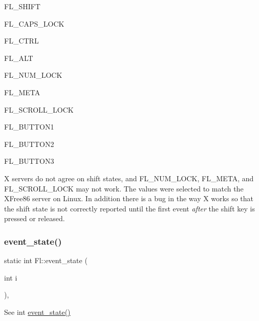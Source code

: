 \begin{DoxyItemize}
\item F\+L\+\_\+\+S\+H\+I\+FT \item F\+L\+\_\+\+C\+A\+P\+S\+\_\+\+L\+O\+CK \item F\+L\+\_\+\+C\+T\+RL \item F\+L\+\_\+\+A\+LT \item F\+L\+\_\+\+N\+U\+M\+\_\+\+L\+O\+CK \item F\+L\+\_\+\+M\+E\+TA \item F\+L\+\_\+\+S\+C\+R\+O\+L\+L\+\_\+\+L\+O\+CK \item F\+L\+\_\+\+B\+U\+T\+T\+O\+N1 \item F\+L\+\_\+\+B\+U\+T\+T\+O\+N2 \item F\+L\+\_\+\+B\+U\+T\+T\+O\+N3\end{DoxyItemize}
X servers do not agree on shift states, and F\+L\+\_\+\+N\+U\+M\+\_\+\+L\+O\+CK, F\+L\+\_\+\+M\+E\+TA, and F\+L\+\_\+\+S\+C\+R\+O\+L\+L\+\_\+\+L\+O\+CK may not work. The values were selected to match the X\+Free86 server on Linux. In addition there is a bug in the way X works so that the shift state is not correctly reported until the first event {\itshape after} the shift key is pressed or released. \mbox{\label{group__fl__events_ga1ff4a74294e833593504ff6531b6d459}} 
\subsubsection{\texorpdfstring{event\+\_\+state()}{event\_state()}\hspace{0.1cm}{\footnotesize\ttfamily [2/2]}}
{\footnotesize\ttfamily static int Fl\+::event\+\_\+state (\begin{DoxyParamCaption}\item[{int}]{i }\end{DoxyParamCaption})\hspace{0.3cm}{\ttfamily [inline]}, {\ttfamily [static]}}

See int \hyperlink{group__fl__events_gafa17a5b4d8d9163631c88142e60447ed}{event\+\_\+state()} \mbox{\label{group__fl__events_ga6647c55948fe1d8be9367267529e9c54}} 
